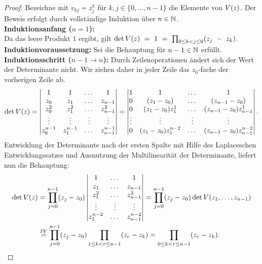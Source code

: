 \begin{proof}
    Bezeichne mit $v_{kj} = z_j^k$ für $k,j \in \{0, \dots, n-1\}$ die Elemente von $V \! \left( z \right)$.
    Der Beweis erfolgt durch vollständige Induktion über $n \in \mathbb{N}$.\\
    \textbf{Induktionsanfang (\boldmath $n=1$):}\\
    Da das leere Produkt $1$ ergibt, gilt
    $\det{V \! \left( z \right)}~=~1~=~\prod_{0 \leq k < j \leq 0} (z_j~-~z_k)$. \\[0.5em]
    \textbf{Induktionvoraussetzung:}
    Sei die Behauptung für $n-1 \in \mathbb{N}$ erfüllt.\\[0.5em]
    \textbf{Induktionsschritt (\boldmath $n\!-\!1 \rightarrow n$):}
    Durch Zeilenoperationen ändert sich der Wert der Determinante nicht.
    Wir ziehen daher in jeder Zeile das $z_0$-fache der vorherigen Zeile ab.
    \[
        \det{V \! \left( z \right)}
        = \begin{vmatrix}
            1         & 1         & \dots & 1 \\
            z_0       & z_1       & \dots & z_{n-1} \\
            z_0^2     & z_1^2     & \dots & z_{n-1}^2 \\
            \vdots    & \vdots    & \vdots & \vdots \\
            z_0^{n-1} & z_1^{n-1} & \dots & z_{n-1}^{n-1}
        \end{vmatrix}
        = \begin{vmatrix}
            1      & 1                  & \dots & 1 \\
            0      & (z_1-z_0)          & \dots & (z_{n-1}-z_0) \\
            0      & (z_1-z_0)z_1^1     & \dots & (z_{n-1}-z_0) z_{n-1}^1 \\
            \vdots & \vdots             & \vdots & \vdots \\
            0      & (z_1-z_0)z_1^{n-2} & \dots & (z_{n-1}-z_0) z_{n-1}^{n-2}
        \end{vmatrix}.
    \]
    Entwicklung der Determinante nach der ersten Spalte mit Hilfe des
    Laplaceschen Entwicklungssatzes und Ausnutzung der Multilinearität der
    Determinante, liefert nun die Behauptung:
    \[
        \begin{split}
            \det{V \! \left( z \right)}
            &= \prod_{j=0}^{n-1} (z_j - z_0) \begin{vmatrix}
                1         & \dots & 1 \\
                z_1       & \dots & z_{n-1} \\
                z_1^2     & \dots & z_{n-1}^2 \\
                \vdots    & \vdots & \vdots \\
                z_1^{n-2} & \dots & z_{n-1}^{n-2}
            \end{vmatrix}
            = \prod_{j=0}^{n-1} (z_j - z_0) \det{V \! \left( z_1, \dots, z_{n-1} \right)}\\
            &\overset{IV}{=} \prod_{j=0}^{n-1} (z_j - z_0) \prod_{1 \leq k < r \leq n-1} (z_r - z_k)
            = \prod_{0 \leq k < r \leq n-1} (z_r - z_k).
        \end{split}
    \]
\end{proof}

